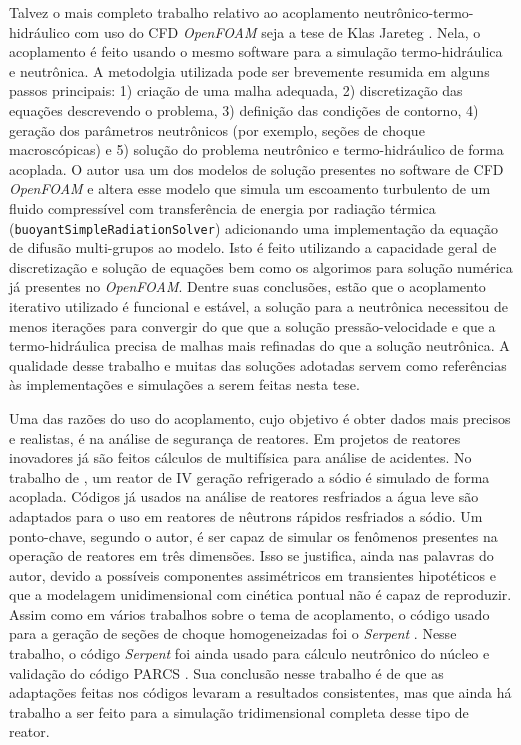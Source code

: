 Talvez o mais completo trabalho relativo ao acoplamento neutrônico-termo-hidráulico com uso do 
CFD \textit{OpenFOAM} seja a tese de Klas Jareteg \cite{Jareteg2012}. Nela, o acoplamento é feito usando o mesmo 
software para a simulação termo-hidráulica e neutrônica. A metodolgia utilizada pode ser brevemente 
resumida em alguns passos principais: 1) criação de uma malha adequada, 2) discretização das 
equações descrevendo o problema, 3) definição das condições de contorno, 4) geração dos 
parâmetros neutrônicos (por exemplo, seções de choque macroscópicas) e 5) solução do 
problema neutrônico e termo-hidráulico de forma acoplada. O autor usa um dos modelos de solução presentes no 
software de CFD \textit{OpenFOAM} \cite{OpenFOAM2013} e 
altera esse modelo que simula um escoamento turbulento de um fluido compressível com transferência de energia
por radiação térmica (\texttt{buoyantSimpleRadiationSolver}) adicionando uma implementação da equação de difusão multi-grupos 
ao modelo. Isto é feito utilizando a capacidade geral de discretização e solução de equações bem como os algorimos 
para solução numérica já presentes no \textit{OpenFOAM}. Dentre suas conclusões, estão que o acoplamento iterativo 
utilizado é funcional e estável, a solução para a neutrônica necessitou de menos iterações para convergir 
do que que a solução pressão-velocidade e que a termo-hidráulica precisa de malhas mais refinadas do que a solução 
neutrônica. A qualidade desse trabalho e muitas das soluções adotadas servem como referências às implementações 
e simulações a serem feitas nesta tese.



Uma das razões do uso do acoplamento, cujo objetivo é obter dados mais precisos e realistas, é na 
análise de segurança de reatores. Em projetos de reatores inovadores já são feitos cálculos de multifísica para 
análise de acidentes. No trabalho de \cite{Lazaro2013}, um reator de IV geração refrigerado a sódio 
é simulado de forma acoplada. Códigos já usados na análise de reatores resfriados a água leve são adaptados 
para o uso em reatores de nêutrons rápidos resfriados a sódio. Um ponto-chave, segundo o autor, é ser capaz 
de simular os fenômenos presentes na operação de reatores em três dimensões. Isso se justifica, ainda nas 
palavras do autor, devido a possíveis componentes assimétricos em transientes hipotéticos e que 
a modelagem unidimensional com cinética pontual não é capaz de reproduzir. Assim como em vários trabalhos 
sobre o tema de acoplamento, o código usado para a geração de seções de choque homogeneizadas 
foi o \textit{Serpent} \cite{Serpent2013}. Nesse trabalho, o código \textit{Serpent} foi ainda usado 
para cálculo neutrônico do núcleo e validação do código PARCS \cite{PARCS2006}. Sua conclusão nesse trabalho 
é de que as adaptações feitas nos códigos levaram a resultados consistentes, mas que ainda há trabalho 
a ser feito para a simulação tridimensional completa desse tipo de reator.

